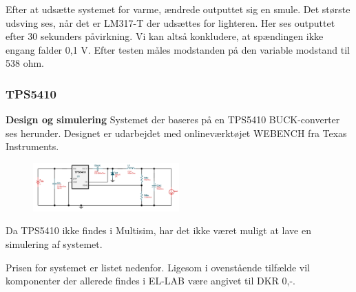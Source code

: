 Efter at udsætte systemet for varme, ændrede outputtet sig en smule. Det største udsving ses, når det er LM317-T der udsættes for lighteren. Her ses outputtet efter 30 sekunders påvirkning. Vi kan altså konkludere, at spændingen ikke engang falder 0,1 V.
Efter testen måles modstanden på den variable modstand til 538 ohm.

\subsubsection{TPS5410}
\label{sec:tps5410}

\textbf{Design og simulering}\newline
Systemet der baseres på en TPS5410 BUCK-converter ses herunder. Designet er udarbejdet med onlineværktøjet WEBENCH fra Texas Instruments. 

\begin{figure}[h]
  \centering
  \includegraphics[width=0.5\textwidth]{dia2.png}
  \caption{}
  \label{fig:bil6}
\end{figure}

Da TPS5410 ikke findes i Multisim, har det ikke været muligt at lave en simulering af systemet.


Prisen for systemet er listet nedenfor. Ligesom i ovenstående tilfælde vil komponenter der allerede findes i EL-LAB være angivet til DKR 0,-.

